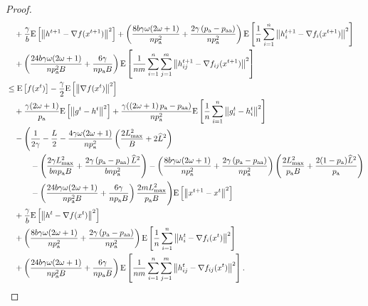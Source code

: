 \documentclass{article}
\newcommand*{\probavailable}{\ensuremath{p_{\textnormal{a}}}}
\newcommand*{\probpairaa}{\ensuremath{p_{\textnormal{aa}}}}
\begin{document}
\begin{proof}
\begin{align*}
      &\quad  + \frac{\gamma}{b} \Exp{\norm{h^{t+1} - \nabla f(x^{t+1})}^2} + \left(\frac{8 b \gamma \omega (2 \omega + 1)}{n \probavailable^2} + \frac{2 \gamma \left(\probavailable - \probpairaa\right)}{n \probavailable^2}\right) \Exp{\frac{1}{n}\sum_{i=1}^n\norm{h^{t+1}_i - \nabla f_i(x^{t+1})}^2}\\
      &\quad + \left(\frac{24 b \gamma \omega (2 \omega + 1)}{n \probavailable^2 B} + \frac{6 \gamma }{n \probavailable B}\right) \Exp{\frac{1}{nm}\sum_{i=1}^n\sum_{j=1}^m\norm{h^{t+1}_{ij} - \nabla f_{ij}(x^{t+1})}^2} \\
      &\leq \Exp{f(x^t)} - \frac{\gamma}{2}\Exp{\norm{\nabla f(x^t)}^2} \\
      &\quad + \frac{\gamma (2 \omega + 1)}{\probavailable} \Exp{\norm{g^{t} - h^{t}}^2} + \frac{\gamma (\left(2 \omega + 1\right)\probavailable - \probpairaa)}{n \probavailable^2} \Exp{\frac{1}{n}\sum_{i=1}^n\norm{g^{t}_i - h^{t}_i}^2} \\
      &\quad - \Bigg(\frac{1}{2\gamma} - \frac{L}{2} - \frac{4 \gamma \omega (2 \omega + 1)}{n \probavailable^2} \left(\frac{2 L_{\max}^2}{B} + 2 \widehat{L}^2\right) \\
      &\qquad\quad - \left(\frac{2 \gamma L_{\max}^2}{b n \probavailable B} + \frac{2 \gamma \left(\probavailable - \probpairaa\right) \widehat{L}^2}{b n \probavailable^2}\right) - \left(\frac{8 b \gamma \omega (2 \omega + 1)}{n \probavailable^2} + \frac{2 \gamma \left(\probavailable - \probpairaa\right)}{n \probavailable^2}\right) \left(\frac{2 L_{\max}^2}{\probavailable B} +\frac{2(1 - \probavailable) \widehat{L}^2}{\probavailable}\right) \\
      &\qquad\quad - \left(\frac{24 b \gamma \omega (2 \omega + 1)}{n \probavailable^2 B} + \frac{6 \gamma }{n \probavailable B}\right) \frac{2 m L_{\max}^2}{\probavailable B} \Bigg) \Exp{\norm{x^{t+1} - x^t}^2} \\
      &\quad + \frac{\gamma}{b} \Exp{\norm{h^{t} - \nabla f(x^{t})}^2} \\
      &\quad + \left(\frac{8 b \gamma \omega (2 \omega + 1)}{n \probavailable^2} + \frac{2 \gamma \left(\probavailable - \probpairaa\right)}{n \probavailable^2}\right)\Exp{\frac{1}{n}\sum_{i=1}^n\norm{h^{t}_i - \nabla f_i(x^{t})}^2} \\
      &\quad + \left(\frac{24 b \gamma \omega (2 \omega + 1)}{n \probavailable^2 B} + \frac{6 \gamma }{n \probavailable B}\right)\Exp{\frac{1}{nm}\sum_{i=1}^n\sum_{j=1}^m\norm{h^{t}_{ij} - \nabla f_{ij}(x^{t})}^2}.
    \end{align*}


\end{proof}
\end{document}
